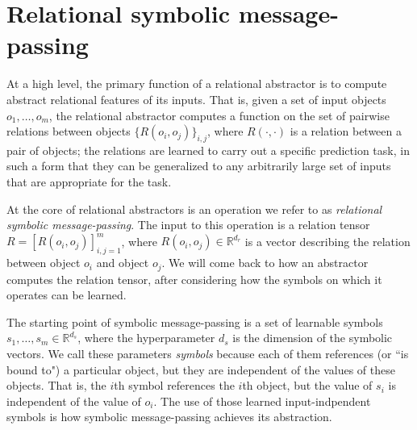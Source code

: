 
\def\m{m}


\section{Relational symbolic message-passing}
\label{sec:message_passing}
\label{sec:abstractors_as_transformer_modules}

At a high level, the primary function of a relational abstractor is to compute abstract relational features of its
inputs. That is, given a set of input objects $o_1, \ldots, o_\m$, the relational abstractor computes a function on
the set of pairwise relations between objects $\{ R(o_i, o_j) \}_{i,j}$, where $R(\cdot, \cdot)$ is a relation between a pair of objects; the relations are learned to carry out a specific prediction task,
in such a form that they can be generalized to any arbitrarily large set of inputs that are appropriate for the task.

At the core of relational abstractors is an operation we refer to as \textit{relational symbolic message-passing}.
The input to this operation is a relation tensor $R = \left[R(o_i, o_j)\right]_{i,j=1}^\m$, where $R(o_i, o_j) \in \mathbb{R}^{d_r}$ is a vector describing the relation between object $o_i$ and object $o_j$. We will come back to how an abstractor computes the relation tensor,
after considering how the symbols on which it operates can be learned.

The starting point of symbolic message-passing is a set of learnable symbols $s_1, \ldots, s_\m \in \mathbb{R}^{d_s}$, where the hyperparameter $d_s$ is the dimension of the symbolic vectors. We call these parameters \textit{symbols} because each of them references (or ``is bound to") a particular object, but they are independent of the values of these objects. That is, the $i$th symbol references the $i$th object, but the value of $s_i$ is independent of the value of $o_i$. The use of those learned input-indpendent symbols is how symbolic message-passing achieves its abstraction.

